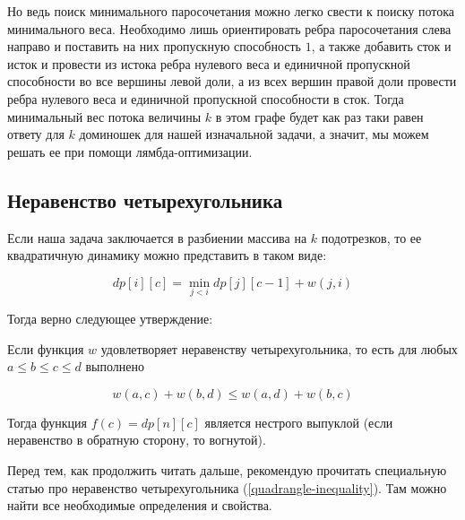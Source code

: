 Но ведь поиск минимального паросочетания можно легко свести к поиску потока минимального веса. Необходимо лишь ориентировать ребра паросочетания слева направо и поставить на них пропускную способность $1$, а также добавить сток и исток и провести из истока ребра нулевого веса и единичной пропускной способности во все вершины левой доли, а из всех вершин правой доли провести ребра нулевого веса и единичной пропускной способности в сток. Тогда минимальный вес потока величины $k$ в этом графе будет как раз таки равен ответу для $k$ доминошек для нашей изначальной задачи, а значит, мы можем решать ее при помощи лямбда-оптимизации.

\subsection{Неравенство четырехугольника} \label{lambda-quadrangle-inequality}

Если наша задача заключается в разбиении массива на $k$ подотрезков, то ее квадратичную динамику можно представить в таком виде:

$$dp[i][c] = \min \limits_{j < i} dp[j][c - 1] + w(j, i)$$

Тогда верно следующее утверждение:

\begin{proposition}
    Если функция $w$ удовлетворяет неравенству четырехугольника, то есть для любых $a \le b \le c \le d$ выполнено

    $$w(a, c) + w(b, d) \le w(a, d) + w(b, c)$$

    Тогда функция $f(c) = dp[n][c]$ является нестрого выпуклой (если неравенство в обратную сторону, то вогнутой).
\end{proposition}

Перед тем, как продолжить читать дальше, рекомендую прочитать специальную статью про неравенство четырехугольника (\ref{quadrangle-inequality}). Там можно найти все необходимые определения и свойства.

